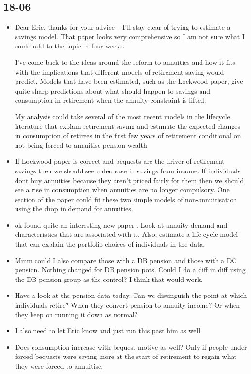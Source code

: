 \documentclass[12pt]{article}
\begin{document}
\subsection{\textbf{18-06}}
\begin{itemize}
  \item Dear Eric, thanks for your advice -- I'll stay clear of trying to estimate a savings model. That paper looks
        very comprehensive so I am not sure what I could add to the topic in four weeks.

        I've come back to the ideas around the reform to annuities and how it fits with the implications that different models
        of retirement saving would predict. Models that have been estimated, such as the Lockwood paper, give quite sharp
        predictions about what should happen to savings and consumption in retirement when the annuity constraint is lifted.

        My analysis could take several of the most recent models in the lifecycle literature that explain retirement saving
        and estimate the expected changes in consumption of retirees in the first few years of retirement conditional on not
        being forced to annuitise pension wealth

  \item If Lockwood paper is correct and bequests are the driver of retirement savings then we should see a decrease in savings
        from income. If individuals dont buy annuities because they aren't priced fairly for them then we should see a rise in consumption
        when annuities are no longer compulsory. One section of the paper could fit these two simple models of non-annuitisation using
        the drop in demand for annuities.


  \item ok found quite an interesting new paper \cite{inkman_et_al_rfs_2011}. Look
        at annuity demand and characteristics that are associated with it. Also,
        estimate a life-cycle model that can explain the portfolio choices
        of individuals in the data.

  \item Mmm could I also compare those with a DB pension and those with a DC pension.
        Nothing changed for DB pension pots. Could I do a diff in diff using the DB pension group
        as the control? I think that would work.

  \item Have a look at the pension data today. Can we distinguish the point at which individuals retire?
        When they convert pension to annuity income? Or when they keep on running it down as normal?

  \item I also need to let Eric know and just run this past him as well.


  \item Does consumption increase with bequest motive as well? Only if people under forced bequests were
        saving more at the start of retirement to regain what they were forced to annuitise.


\end{itemize}
\end{document}
